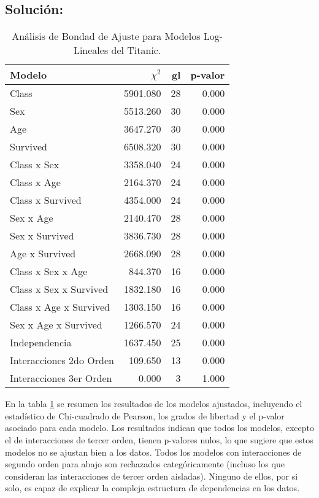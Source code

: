 \documentclass[paper=letter, fontsize=11pt]{scrartcl}\usepackage[]{graphicx}\usepackage[]{xcolor}
\numberwithin{equation}{problemcounter} %
\numberwithin{figure}{problemcounter} %
\numberwithin{table}{problemcounter} %
\numberwithin{subsection}{problemcounter}
\begin{document}
\subsection{\textbf{Solución:}}




\begin{table}[htbp]
\centering
\begin{tabular}{|l|rrr|}
\hline
\textbf{Modelo} & \textbf{$\chi^2$} & \textbf{gl} & \textbf{p-valor} \\
\hline
Class & 5901.080 & 28 & 0.000 \\
Sex & 5513.260 & 30 & 0.000 \\
Age & 3647.270 & 30 & 0.000 \\
Survived & 6508.320 & 30 & 0.000 \\
Class x Sex & 3358.040 & 24 & 0.000 \\
Class x Age & 2164.370 & 24 & 0.000 \\
Class x Survived & 4354.000 & 24 & 0.000 \\
Sex x Age & 2140.470 & 28 & 0.000 \\
Sex x Survived & 3836.730 & 28 & 0.000 \\
Age x Survived & 2668.090 & 28 & 0.000 \\
Class x Sex x Age & 844.370 & 16 & 0.000 \\
Class x Sex x Survived & 1832.180 & 16 & 0.000 \\
Class x Age x Survived & 1303.150 & 16 & 0.000 \\
Sex x Age x Survived & 1266.570 & 24 & 0.000 \\
Independencia & 1637.450 & 25 & 0.000 \\
Interacciones 2do Orden & 109.650 & 13 & 0.000 \\
Interacciones 3er Orden & 0.000 & 3 & 1.000 \\
\hline
\end{tabular}
\caption{Análisis de Bondad de Ajuste para Modelos Log-Lineales del Titanic.}
\label{tab:resumen_modelos}
\end{table}

En la tabla \ref{tab:resumen_modelos} se resumen los resultados de los modelos ajustados, incluyendo el estadístico de Chi-cuadrado de Pearson, los grados de libertad y el p-valor asociado para cada modelo. Los resultados indican que todos los modelos, excepto el de interacciones de tercer orden, tienen p-valores nulos, lo que sugiere que estos modelos no se ajustan bien a los datos. Todos los modelos con interacciones de segundo orden para abajo son rechazados categóricamente (incluso los que consideran las interacciones de tercer orden aisladas). Ninguno de ellos, por si solo, es capaz de explicar la compleja estructura de dependencias en los datos. 
\end{document}

